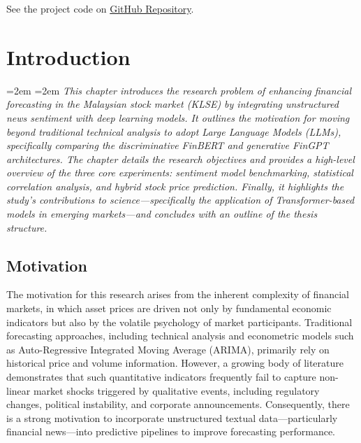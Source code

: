 \documentclass[singlespace]{ucetd}
\newcommand{\chapterabstract}[1]{%
  \par\vspace{1em}
  \begingroup
  \leftskip=2em
  \rightskip=2em
  \noindent\itshape
  #1
  \par
  \endgroup
  \vspace{1.5em}
}
\begin{document}
\begin{center}
See the project code on
\href{https://github.com/anasamri12/finbert-vs-fingpt.git}{GitHub Repository}.
\end{center}




\acknowledgments


\makededication
\makeepigraph


\tableofcontents
\listoffigures
\listoftables



\mainmatter




\chapter{Introduction}


\chapterabstract{%
This chapter introduces the research problem of enhancing financial forecasting in the Malaysian stock market (KLSE) by integrating unstructured news sentiment with deep learning models. It outlines the motivation for moving beyond traditional technical analysis to adopt Large Language Models (LLMs), specifically comparing the discriminative FinBERT and generative FinGPT architectures. The chapter details the research objectives and provides a high-level overview of the three core experiments: sentiment model benchmarking, statistical correlation analysis, and hybrid stock price prediction. Finally, it highlights the study's contributions to science—specifically the application of Transformer-based models in emerging markets—and concludes with an outline of the thesis structure.
}

\section{Motivation}

The motivation for this research arises from the inherent complexity of financial markets, in which asset prices are driven not only by fundamental economic indicators but also by the volatile psychology of market participants. Traditional forecasting approaches, including technical analysis and econometric models such as Auto-Regressive Integrated Moving Average (ARIMA), primarily rely on historical price and volume information. However, a growing body of literature demonstrates that such quantitative indicators frequently fail to capture non-linear market shocks triggered by qualitative events, including regulatory changes, political instability, and corporate announcements. Consequently, there is a strong motivation to incorporate unstructured textual data—particularly financial news—into predictive pipelines to improve forecasting performance.
\end{document}
